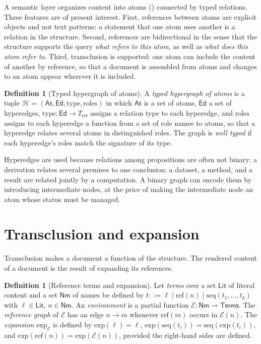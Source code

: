 \documentclass[11pt,twoside,openright]{book}
\theoremstyle{plain}
\theoremstyle{definition}
\newtheorem{definition}[theorem]{Definition}
\theoremstyle{remark}
\begin{document}
A semantic layer organizes content into atoms () connected by typed relations. Three features are of present interest. First, references between atoms are explicit objects and not text patterns: a statement that one atom uses another is a relation in the structure. Second, references are bidirectional in the sense that the structure supports the query \emph{what refers to this atom}, as well as \emph{what does this atom refer to}. Third, transclusion is supported: one atom can include the content of another by reference, so that a document is assembled from atoms and changes to an atom appear wherever it is included.

\begin{definition}[Typed hypergraph of atoms]\label{def:hypergraph}
A \emph{typed hypergraph of atoms} is a tuple $\mathcal{H}=(\mathsf{At},\mathsf{Ed},\mathrm{type},\mathrm{roles})$ in which $\mathsf{At}$ is a set of atoms, $\mathsf{Ed}$ a set of hyperedges, $\mathrm{type}:\mathsf{Ed}\to T_{\mathrm{rel}}$ assigns a relation type to each hyperedge, and $\mathrm{roles}$ assigns to each hyperedge a function from a set of role names to atoms, so that a hyperedge relates several atoms in distinguished roles. The graph is \emph{well typed} if each hyperedge's roles match the signature of its type.
\end{definition}

Hyperedges are used because relations among propositions are often not binary: a derivation relates several premises to one conclusion; a dataset, a method, and a result are related jointly by a computation. A binary graph can encode them by introducing intermediate nodes, at the price of making the intermediate node an atom whose status must be managed.

\section{Transclusion and expansion}

Transclusion makes a document a function of the structure. The rendered content of a document is the result of expanding its references.

\begin{definition}[Reference terms and expansion]\label{def:expansion}
Let \emph{terms} over a set $\mathsf{Lit}$ of literal content and a set $\mathsf{Nm}$ of names be defined by $t::=\ell\mid\mathrm{ref}(n)\mid\mathrm{seq}(t_1,\dots,t_k)$ with $\ell\in\mathsf{Lit}$, $n\in\mathsf{Nm}$. An \emph{environment} is a partial function $\mathcal{E}:\mathsf{Nm}\rightharpoonup\mathsf{Terms}$. The \emph{reference graph} of $\mathcal{E}$ has an edge $n\to m$ whenever $\mathrm{ref}(m)$ occurs in $\mathcal{E}(n)$. The \emph{expansion} $\mathrm{exp}_\mathcal{E}$ is defined by $\mathrm{exp}(\ell)=\ell$, $\mathrm{exp}(\mathrm{seq}(t_i))=\mathrm{seq}(\mathrm{exp}(t_i))$, and $\mathrm{exp}(\mathrm{ref}(n))=\mathrm{exp}(\mathcal{E}(n))$, provided the right-hand sides are defined.
\end{definition}
\end{document}
